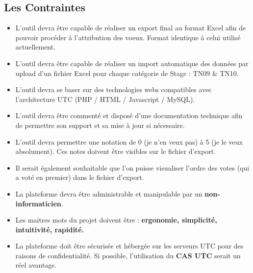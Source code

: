 \documentclass[a4paper,titlepage]{scrartcl}
\begin{document}
\subsection{Les Contraintes}

\begin{itemize}
	\item L’outil devra être capable de réaliser un export final au format Excel afin de pouvoir procéder à l’attribution des voeux. Format identique à celui utilisé actuellement.\\
	
	\item L’outil devra être capable de réaliser un import automatique des données par upload d’un fichier Excel pour chaque catégorie de Stage : TN09 \& TN10.\\
	
	\item L’outil devra se baser sur des technologies webs compatibles avec l’architecture UTC (PHP / HTML / Javascript / MySQL).\\
	
	\item L’outil devra être commenté et disposé d’une documentation technique afin de permettre son support et sa mise à jour si nécessaire.\\
	
	\item L’outil devra permettre une notation de 0 (je n’en veux pas) à 5 (je le veux absolument). Ces notes doivent être visibles sur le fichier d’export.\\
	
	\item Il serait également souhaitable que l'on puisse visualiser l'ordre des votes (qui a voté en premier) dans le fichier d'export.\\
	
	\item La plateforme devra être administrable et manipulable par un \textbf{non-informaticien}.\\
	
	\item Les maitres mots du projet doivent être : \textbf{ergonomie, simplicité, intuitivité, rapidité.} \\
	
	\item La plateforme doit être sécurisée et hébergée sur les serveurs UTC pour des raisons de confidentialité. Si possible, l'utilisation du \textbf{CAS UTC} serait un réel avantage. \\
	
\end{itemize}
\end{document}
